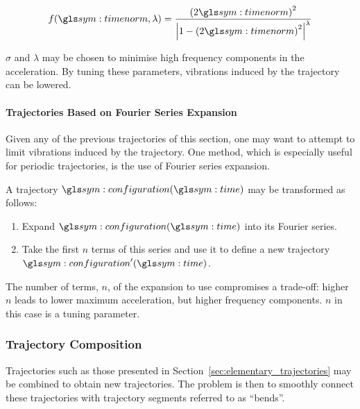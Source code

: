 				\begin{equation}
					f(\timenorm, \lambda) =
						\frac
						{%
							{(2\timenorm)}^2
						}
						{%
							{%
								\left|
									1 - {(2\timenorm)}^2
								\right|
							}^\lambda
						}
				\end{equation}

				$\sigma$ and $\lambda$ may be chosen to
				minimise high frequency components in the acceleration. By
				tuning these parameters, vibrations induced by the trajectory
				can be lowered.

			\paragraph{Trajectories Based on Fourier Series Expansion}

				Given any of the previous trajectories of this section, one may
				want to attempt to limit vibrations induced by the trajectory.
				One method, which is especially useful for periodic
				trajectories, is the use of Fourier series expansion.

				A trajectory $\configuration(\timesym)$ may be transformed as
				follows:

				\begin{enumerate}

					\item

						Expand $\configuration(\timesym)$ into its Fourier
						series.

					\item

						Take the first $n$ terms of this series and use it to
						define a new trajectory $\configuration'(\timesym)$.
				\end{enumerate}

				The number of terms, $n$, of the expansion to use compromises a
				trade-off: higher $n$ leads to lower maximum acceleration, but
				higher frequency components. $n$ in this case is a tuning
				parameter.

		\subsubsection{Trajectory Composition}%
		\label{sec:trajetory_composition}

			Trajectories such as those presented in
			Section~\ref{sec:elementary_trajectories} may be combined to obtain
			new trajectories. The problem is then to smoothly connect these
			trajectories with trajectory segments referred to as
			``bends''.

